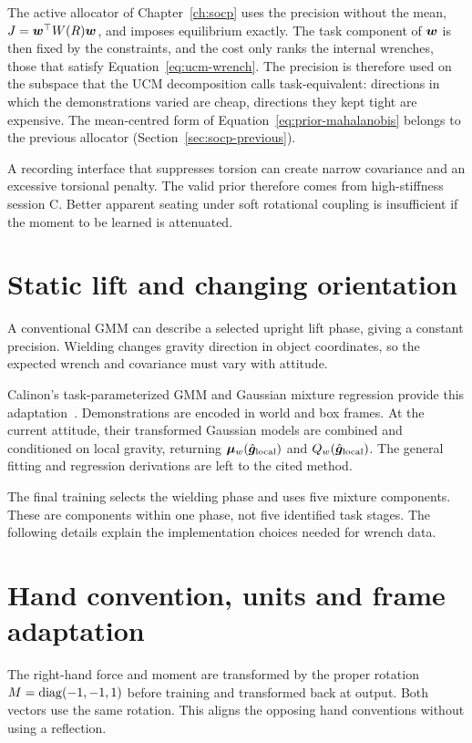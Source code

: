 The active allocator of Chapter~\ref{ch:socp} uses the precision without the mean, $J=\bm{w}^\top W(R)\bm{w}$, and imposes equilibrium exactly. The task component of $\bm{w}$ is then fixed by the constraints, and the cost only ranks the internal wrenches, those that satisfy Equation~\eqref{eq:ucm-wrench}. The precision is therefore used on the subspace that the UCM decomposition calls task-equivalent: directions in which the demonstrations varied are cheap, directions they kept tight are expensive. The mean-centred form of Equation~\eqref{eq:prior-mahalanobis} belongs to the previous allocator (Section~\ref{sec:socp-previous}).

A recording interface that suppresses torsion can create narrow covariance and an excessive torsional penalty. The valid prior therefore comes from high-stiffness session C. Better apparent seating under soft rotational coupling is insufficient if the moment to be learned is attenuated.

\section{Static lift and changing orientation}

A conventional GMM can describe a selected upright lift phase, giving a constant precision. Wielding changes gravity direction in object coordinates, so the expected wrench and covariance must vary with attitude.

Calinon's task-parameterized GMM and Gaussian mixture regression provide this adaptation~\cite{calinon2016}. Demonstrations are encoded in world and box frames. At the current attitude, their transformed Gaussian models are combined and conditioned on local gravity, returning $\bm{\mu}_w(\hat{\bm{g}}_{\mathrm{local}})$ and $Q_w(\hat{\bm{g}}_{\mathrm{local}})$. The general fitting and regression derivations are left to the cited method.

The final training selects the wielding phase and uses five mixture components. These are components within one phase, not five identified task stages. The following details explain the implementation choices needed for wrench data.

\section{Hand convention, units and frame adaptation}

The right-hand force and moment are transformed by the proper rotation $M=\operatorname{diag}(-1,-1,1)$ before training and transformed back at output. Both vectors use the same rotation. This aligns the opposing hand conventions without using a reflection.

